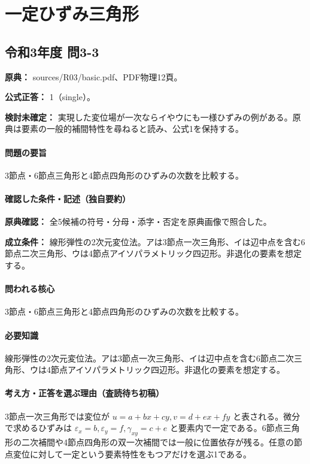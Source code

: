 \section{一定ひずみ三角形}

\subsection{令和3年度 問3-3}
\label{q:r03-reg-basic-3-3}

\noindent\textbf{原典：} sources/R03/basic.pdf、PDF物理12頁。

\textbf{公式正答：} 1（single）。

\par\textbf{検討未確定：} 実現した変位場が一次ならイやウにも一様ひずみの例がある。原典は要素の一般的補間特性を尋ねると読み、公式1を保持する。

\paragraph{問題の要旨} 3節点・6節点三角形と4節点四角形のひずみの次数を比較する。

\paragraph{確認した条件・記述（独自要約）}\mbox{}\par

\noindent\textbf{原典確認：} 全5候補の符号・分母・添字・否定を原典画像で照合した。\par

\noindent\textbf{成立条件：} 線形弾性の2次元変位法。アは3節点一次三角形、イは辺中点を含む6節点二次三角形、ウは4節点アイソパラメトリック四辺形。非退化の要素を想定する。\par

\paragraph{問われる核心} 3節点・6節点三角形と4節点四角形のひずみの次数を比較する。

\paragraph{必要知識} 線形弾性の2次元変位法。アは3節点一次三角形、イは辺中点を含む6節点二次三角形、ウは4節点アイソパラメトリック四辺形。非退化の要素を想定する。

\paragraph{考え方・正答を選ぶ理由（査読待ち初稿）} 3節点一次三角形では変位が \(u=a+bx+cy,v=d+ex+fy\) と表される。微分で求めるひずみは \(\varepsilon_x=b,\varepsilon_y=f,\gamma_{xy}=c+e\) と要素内で一定である。6節点三角形の二次補間や4節点四角形の双一次補間では一般に位置依存が残る。任意の節点変位に対して一定という要素特性をもつアだけを選ぶ1である。

